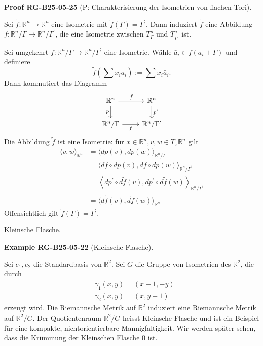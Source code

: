 \documentclass[10pt, letterpaper]{article}
\newcommand{\CustomHeading}[3]{%
  \par\medskip\noindent%
  \textbf{#1 #2} \textnormal{(#3)}.\enskip%
}
\newenvironment{EXA}[2]{\begin{unitbox}\CustomHeading{Example}{#1}{#2}}{\end{unitbox}}
\newenvironment{PROOF}[2]{\begin{unitbox}\CustomHeading{Proof}{#1}{#2}}{\end{unitbox}}
\begin{document}
\begin{PROOF}{RG-B25-05-25}{P: Charakterisierung der Isometrien von flachen Tori}
Sei $\tilde{f}: \mathbb{R}^{n} \rightarrow \mathbb{R}^{n}$ eine Isometrie mit $\tilde{f}(\Gamma)=\Gamma^{\prime}$. Dann induziert $\tilde{f}$ eine Abbildung $f: \mathbb{R}^{n} / \Gamma \rightarrow \mathbb{R}^{n} / \Gamma^{\prime}$, die eine Isometrie zwischen $T_{\Gamma}^{n}$ und $T_{\Gamma^{\prime}}^{n}$ ist.

Sei umgekehrt $f: \mathbb{R}^{n} / \Gamma \rightarrow \mathbb{R}^{n} / \Gamma^{\prime}$ eine Isometrie. Wähle $\bar{a}_{i} \in f (a_{i}+ \Gamma)$ und definiere
$$
\tilde{f}\left(\sum x_{i} a_{i}\right):=\sum x_{i} \bar{a}_{i} .
$$
Dann kommutiert das Diagramm
\[
\begin{tikzcd}
\mathbb{R}^n \arrow[r, "\tilde{f}"] \arrow[d, "p"'] & \mathbb{R}^n \arrow[d, "p'"] \\
\mathbb{R}^n / \Gamma \arrow[r, "f"'] & \mathbb{R}^n / \Gamma'
\end{tikzcd}
\]
Die Abbildung $\tilde{f}$ ist eine Isometrie: für $x \in \mathbb{R}^{n}, v, w \in T_{x} \mathbb{R}^{n}$ gilt
$$
\begin{aligned}
\langle v, w\rangle_{\mathbb{R}^{n}} & =\langle d p(v), d p(w)\rangle_{\mathbb{R}^{n} / \Gamma} \\
& =\langle d f \circ d p(v), d f \circ d p(w)\rangle_{\mathbb{R}^{n} / \Gamma^{\prime}} \\
& =\left\langle d p^{\prime} \circ d \tilde{f}(v), d p^{\prime} \circ d \tilde{f}(w)\right\rangle_{\mathbb{R}^{n} / \Gamma^{\prime}} \\
& =\langle d \tilde{f}(v), d \tilde{f}(w)\rangle_{\mathbb{R}^{n}}
\end{aligned}
$$
Offensichtlich gilt $\tilde{f}(\Gamma)=\Gamma^{\prime}$.
\end{PROOF}



Kleinsche Flasche. 

\begin{EXA}{RG-B25-05-22}{Kleinsche Flasche}
Sei $e_{1}, e_{2}$ die Standardbasis von $\mathbb{R}^{2}$. Sei $G$ die Gruppe von Isometrien des $\mathbb{R}^{2}$, die durch
$$
\begin{aligned}
& \gamma_{1}(x, y)=(x+1,-y) \\
& \gamma_{2}(x, y)=(x, y+1)
\end{aligned}
$$
erzeugt wird. Die Riemannsche Metrik auf $\mathbb{R}^{2}$ induziert eine Riemannsche Metrik auf $\mathbb{R}^{2} / G$. Der Quotientenraum $\mathbb{R}^{2} / G$ heisst Kleinsche Flasche und ist ein Beispiel für eine kompakte, nichtorientierbare Mannigfaltigkeit. Wir werden später sehen, dass die Krümmung der Kleinschen Flasche 0 ist.
\end{EXA}
\end{document}
